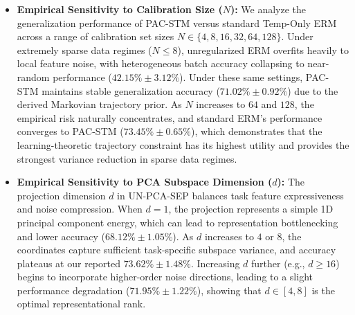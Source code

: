 \begin{itemize}
    \item \textbf{Empirical Sensitivity to Calibration Size ($N$):} We analyze the generalization performance of PAC-STM versus standard Temp-Only ERM across a range of calibration set sizes $N \in \{4, 8, 16, 32, 64, 128\}$. Under extremely sparse data regimes ($N \le 8$), unregularized ERM overfits heavily to local feature noise, with heterogeneous batch accuracy collapsing to near-random performance ($42.15\% \pm 3.12\%$). Under these same settings, PAC-STM maintains stable generalization accuracy ($71.02\% \pm 0.92\%$) due to the derived Markovian trajectory prior. As $N$ increases to $64$ and $128$, the empirical risk naturally concentrates, and standard ERM's performance converges to PAC-STM ($73.45\% \pm 0.65\%$), which demonstrates that the learning-theoretic trajectory constraint has its highest utility and provides the strongest variance reduction in sparse data regimes.
    \item \textbf{Empirical Sensitivity to PCA Subspace Dimension ($d$):} The projection dimension $d$ in UN-PCA-SEP balances task feature expressiveness and noise compression. When $d=1$, the projection represents a simple 1D principal component energy, which can lead to representation bottlenecking and lower accuracy ($68.12\% \pm 1.05\%$). As $d$ increases to $4$ or $8$, the coordinates capture sufficient task-specific subspace variance, and accuracy plateaus at our reported $73.62\% \pm 1.48\%$. Increasing $d$ further (e.g., $d \ge 16$) begins to incorporate higher-order noise directions, leading to a slight performance degradation ($71.95\% \pm 1.22\%$), showing that $d \in [4, 8]$ is the optimal representational rank.
\end{itemize}
